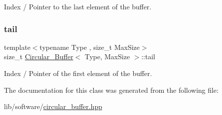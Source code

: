 Index / Pointer to the last element of the buffer. 

\mbox{\label{classCircular__Buffer_a6eb4d6b77a513a6b9bd8465197e48ad4}} 
\subsubsection{\texorpdfstring{tail}{tail}}
{\footnotesize\ttfamily template$<$typename Type , size\+\_\+t Max\+Size$>$ \\
size\+\_\+t \hyperlink{classCircular__Buffer}{Circular\+\_\+\+Buffer}$<$ Type, Max\+Size $>$\+::tail\hspace{0.3cm}{\ttfamily [private]}}



Index / Pointer of the first element of the buffer. 



The documentation for this class was generated from the following file\+:\begin{DoxyCompactItemize}
\item 
lib/software/\hyperlink{circular__buffer_8hpp}{circular\+\_\+buffer.\+hpp}\end{DoxyCompactItemize}
